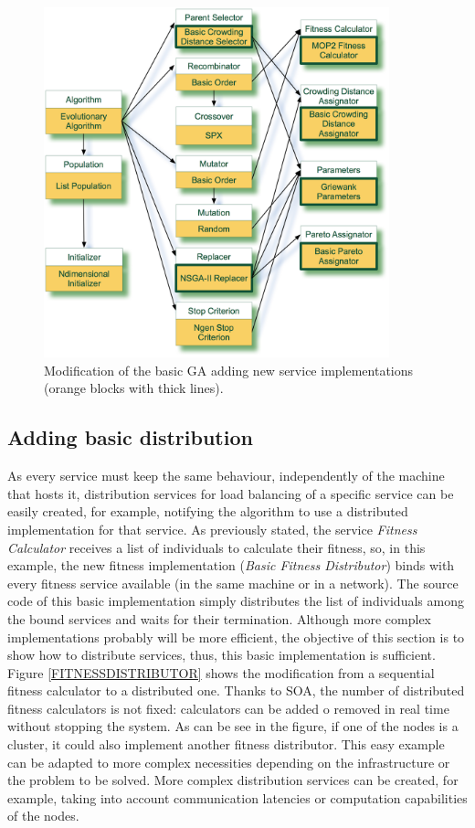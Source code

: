 \begin{figure}
\centering
\includegraphics[width=10cm]{gfx/soaea/nsga2.jpg}
\caption{Modification of the basic GA adding new service implementations (orange blocks with thick lines).}
\label{fig:nsga2}
\end{figure}



\subsection{Adding basic distribution}
\label{sec:distribution}

As every service must keep the same behaviour, independently of the machine that hosts it, distribution services for load balancing of a specific service can be easily created, for example, notifying the algorithm to use a distributed implementation for that service. As previously stated, the service {\em Fitness Calculator} receives a list of individuals to calculate their fitness, so, in this example, the new fitness implementation ({\em Basic Fitness Distributor}) binds with every fitness service available (in the same machine or in a network). The source code of this basic implementation simply distributes the list of individuals among the bound services and waits for their termination. Although more complex implementations probably will be more efficient, the objective of this section is to show how to distribute services, thus, this basic implementation is sufficient. Figure \ref{FITNESSDISTRIBUTOR} shows the modification from a sequential fitness calculator to a distributed one. Thanks to SOA, the number of distributed fitness calculators is not fixed: calculators can be added o removed in real time without stopping the system. As can be see in the figure, if one of the nodes is a cluster, it could also  implement another fitness distributor. This easy example can be adapted to more complex necessities depending on the infrastructure or the problem to be solved. More complex distribution services can be created, for example, taking into account communication latencies or computation capabilities of the nodes.




